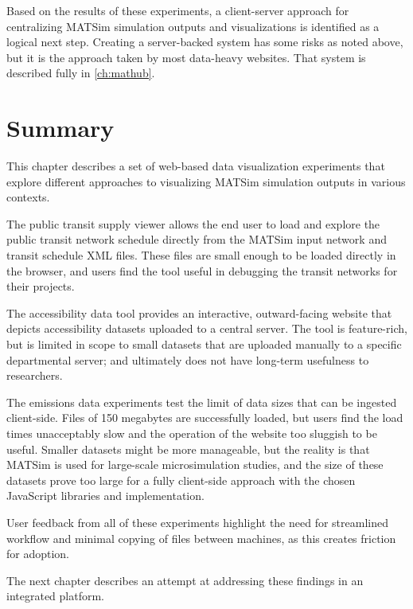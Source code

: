 Based on the results of these experiments, a client-server approach for centralizing MATSim simulation outputs and visualizations is identified as a logical next step. Creating a server-backed system has some risks as noted above, but it is the approach taken by most data-heavy websites. That system is described fully in \autoref{ch:mathub}.

\hypertarget{server-experiments-summary}{%
\section{Summary}\label{server-experiments-summary}}

This chapter describes a set of web-based data visualization experiments that explore different approaches to visualizing MATSim simulation outputs in various contexts.

The public transit supply viewer allows the end user to load and explore the public transit network schedule directly from the MATSim input network and transit schedule XML files. These files are small enough to be loaded directly in the browser, and users find the tool useful in debugging the transit networks for their projects.

The accessibility data tool provides an interactive, outward-facing website that depicts accessibility datasets uploaded to a central server. The tool is feature-rich, but is limited in scope to small datasets that are uploaded manually to a specific departmental server; and ultimately does not have long-term usefulness to researchers.

The emissions data experiments test the limit of data sizes that can be ingested client-side. Files of 150 megabytes are successfully loaded, but users find the load times unacceptably slow and the operation of the website too sluggish to be useful. Smaller datasets might be more manageable, but the reality is that MATSim is used for large-scale microsimulation studies, and the size of these datasets prove too large for a fully client-side approach with the chosen JavaScript libraries and implementation.

User feedback from all of these experiments highlight the need for streamlined workflow and minimal copying of files between machines, as this creates friction for adoption.

The next chapter describes an attempt at addressing these findings in an integrated platform.
